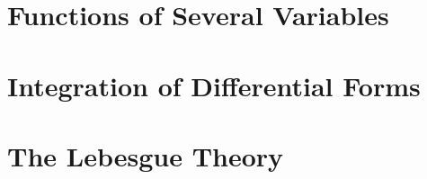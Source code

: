 \documentclass[UTF8]{ctexart}
\theoremstyle{thm}
\theoremstyle{dfn}
\theoremstyle{named}
\begin{document}
\section{Functions of Several Variables}
% 
% 
% 
% 
% 
% 
% 
% 
% 
\newpage

\section{Integration of Differential Forms}
% 
% 
% 
% 
% 
% 
% 
% 
% 
\newpage

\section{The Lebesgue Theory}
% 
% 
% 
% 
% 
% 
% 
% 
% 
\newpage
\end{document}
